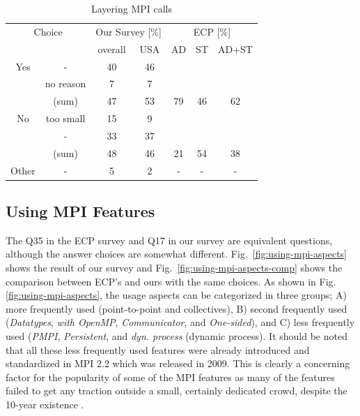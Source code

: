 \documentclass[preprint,5p,times]{elsarticle}
\def\myquote#1{{\it #1}}
\newcommand{\revision}[2]{{\color{blue}#2}}
\begin{document}
\begin{table}[tb]%
  \small%
  \begin{center}%
    \caption{Layering MPI calls}\label{tab:layering-mpi-calls}%
    \vspace{-1.5mm}
    \begin{tabular}{c|c||c|c||c|c|c}%
      \hline%
      \multicolumn{2}{c||}{Choice} & \multicolumn{2}{c||}{Our Survey [\%]} &
      \multicolumn{3}{c}{ECP [\%]} \\
      \cline{3-7}%
      \multicolumn{2}{c||}{} & overall & USA & AD & ST & AD+ST \\
      \hline%
      \hline%
      Yes & - & 40 & 46 & & & \\
      & no reason & 7 & 7 & & & \\
      \cline{2-4}%
      & (sum) & 47 & 53 &  79 & 46 & 62 \\
      \hline%
      \hline%
      No & too small & 15 & 9 & & & \\
      & - & 33 & 37 & & & \\
      \cline{2-4}%
      & (sum) & 48 & 46 & 21 & 54 & 38 \\
      \hline%
      \hline%
      Other & - & 5 & 2 & - & - & - \\
      \hline%
    \end{tabular}%
\vspace{-3mm}%
  \end{center}%
\end{table}%

\subsection{Using MPI Features}\label{sec:mpi-aspects}

The Q35 in the ECP survey and Q17 in our survey are equivalent
questions, although the answer choices are somewhat
different. Fig.~\ref{fig:using-mpi-aspects} shows the result of our
survey and Fig.~\ref{fig:using-mpi-aspects-comp} shows the comparison
between ECP's and ours with the same choices. As shown in
Fig.\ref{fig:using-mpi-aspects}, the
usage aspects can be categorized in three groups; A) more frequently
used (point-to-point and collectives), B) second frequently used
(\myquote{Datatypes}, \myquote{with OpenMP}, \myquote{Communicator}, and \myquote{One-sided}), and C) less
frequently used (\myquote{PMPI}, \myquote{Persistent}, and
\myquote{dyn. process} (dynamic process).
%
It should be noted that all these less frequently used features were already
introduced and standardized in MPI 2.2 which was \revision{release}{released} in 2009. This is
clearly a concerning factor for the popularity of some of the MPI features as
many of the features failed to get any traction
outside a small, certainly dedicated crowd, despite the 10-year existence .
\end{document}
